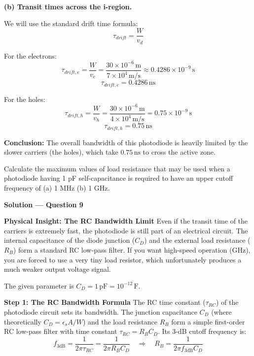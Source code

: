 \textbf{(b) Transit times across the i-region.}

We will use the standard drift time formula:
\begin{equation*}
  \tau_{drift} = \frac{W}{v_d}
\end{equation*}

For the electrons:
\begin{equation*}
  \tau_{drift,e} = \frac{W}{v_e} = \frac{30\times10^{-6}\,\text{m}}{7\times10^4\,\text{m/s}} \approx 0.4286\times10^{-9}\,\text{s}
\end{equation*}
\begin{equation*}
  \boxed{\tau_{drift,e} = 0.4286\,\text{ns}}
\end{equation*}

For the holes:
\begin{equation*}
  \tau_{drift,h} = \frac{W}{v_h} = \frac{30\times10^{-6}\,\text{m}}{4\times10^4\,\text{m/s}} = 0.75\times10^{-9}\,\text{s}
\end{equation*}
\begin{equation*}
  \boxed{\tau_{drift,h} = 0.75\,\text{ns}}
\end{equation*}

\textbf{Conclusion:} The overall bandwidth of this photodiode is heavily limited by the slower carriers (the holes), which take $0.75\,\text{ns}$ to cross the active zone.

\begin{question}[Question 9]
Calculate the maximum values of load resistance that may be used when a photodiode having 1 pF self-capacitance is required to have an upper cutoff frequency of (a) 1 MHz (b) 1 GHz.
\end{question}

\textbf{\large Solution --- Question 9}

\textbf{Physical Insight: The RC Bandwidth Limit}
Even if the transit time of the carriers is extremely fast, the photodiode is still part of an electrical circuit. The internal capacitance of the diode junction ($C_D$) and the external load resistance ($R_B$) form a standard RC low-pass filter. If you want high-speed operation (GHz), you are forced to use a very tiny load resistor, which unfortunately produces a much weaker output voltage signal.

The given parameter is $C_D = 1\,\text{pF} = 10^{-12}\,\text{F}$.

\textbf{Step 1: The RC Bandwidth Formula}
The RC time constant ($\tau_{RC}$) of the photodiode circuit sets its bandwidth. The junction capacitance $C_D$ (where theoretically $C_D = \epsilon_s A / W$) and the load resistance $R_B$ form a simple first-order RC low-pass filter with time constant $\tau_{RC} = R_B C_D$. Its 3-dB cutoff frequency is:
\begin{equation*}
  f_{3\text{dB}} = \frac{1}{2\pi \tau_{RC}} = \frac{1}{2\pi R_B C_D} \quad\Longrightarrow\quad R_B = \frac{1}{2\pi f_{3\text{dB}} C_D}
\end{equation*}

